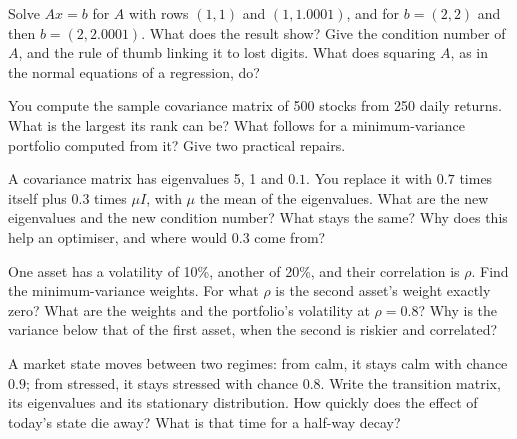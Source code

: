 \begin{question}\label{iq:iv1:linear-algebra:11}
Solve $Ax = b$ for $A$ with rows $(1, 1)$ and $(1, 1.0001)$, and for $b = (2, 2)$ and then $b = (2, 2.0001)$. What does the result show? Give the condition number of $A$, and the rule of thumb linking it to lost digits. What does squaring $A$, as in the normal equations of a regression, do?
\end{question}

\begin{question}\label{iq:iv1:linear-algebra:12}
You compute the sample covariance matrix of 500 stocks from 250 daily returns. What is the largest its rank can be? What follows for a minimum-variance portfolio computed from it? Give two practical repairs.
\end{question}

\begin{question}\label{iq:iv1:linear-algebra:13}
A covariance matrix has eigenvalues 5, 1 and $0.1$. You replace it with $0.7$ times itself plus $0.3$ times $\mu I$, with $\mu$ the mean of the eigenvalues. What are the new eigenvalues and the new condition number? What stays the same? Why does this help an optimiser, and where would $0.3$ come from?
\end{question}

\begin{question}\label{iq:iv1:linear-algebra:14}
One asset has a volatility of 10\%, another of 20\%, and their correlation is $\rho$. Find the minimum-variance weights. For what $\rho$ is the second asset's weight exactly zero? What are the weights and the portfolio's volatility at $\rho = 0.8$? Why is the variance below that of the first asset, when the second is riskier and correlated?
\end{question}

\begin{question}\label{iq:iv1:linear-algebra:15}
A market state moves between two regimes: from calm, it stays calm with chance $0.9$; from stressed, it stays stressed with chance $0.8$. Write the transition matrix, its eigenvalues and its stationary distribution. How quickly does the effect of today's state die away? What is that time for a half-way decay?
\end{question}

